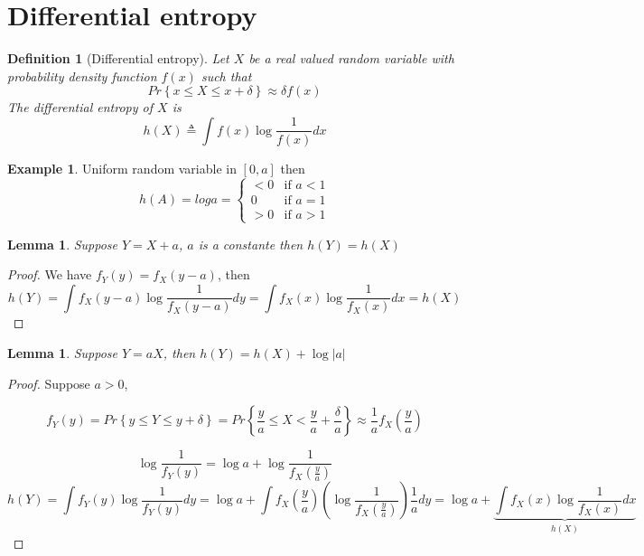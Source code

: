 \documentclass[twoside]{article}
\newtheorem{lemma}[theorem]{Lemma}
\newtheorem{definition}{Definition}[section]
\theoremstyle{definition} %
\newtheorem{example}{Example}
\renewcommand{\Pr}[1]{Pr\left\{#1\right\}}
\newcommand{\pfrac}[2]{\left( \frac{#1}{#2} \right)}
\begin{document}

\cleardoublepage
\section{Differential entropy}

\begin{definition}[Differential entropy]
  Let $X$ be a real valued random variable with probability density function $f(x)$ such that
  \[
    \Pr{x \leq X \leq x + \delta} \approx \delta f(x)
  \]
  The differential entropy of $X$ is
  \[
    h(X) \triangleq \int f(x) \log \frac 1 {f(x)} dx
  \]
\end{definition}

\begin{example}
  Uniform random variable in $[0,a]$ then \[
    h(A) = log a = \begin{cases}
      < 0 & \text{if } a < 1\\
      0 & \text{if } a = 1\\
      > 0 & \text{if } a > 1
    \end{cases}
  \]
\end{example}

\begin{lemma}
  Suppose $Y=X+a$, $a$ is a constante then $h(Y)=h(X)$
\end{lemma}

\begin{proof}
  We have $f_Y(y) = f_X(y-a)$, then
  \[
    h(Y) = \int f_X(y-a) \log \frac 1 {f_X(y-a)}dy = \int f_X(x) \log \frac 1 {f_X(x)}dx = h(X)
  \]
\end{proof}

\begin{lemma}
  Suppose $Y=aX$, then $h(Y) = h(X) + \log |a|$
\end{lemma}

\begin{proof}
  Suppose $a > 0$,

  \[
    f_Y(y) = \Pr{y\leq Y \leq y + \delta} = \Pr{\frac y a \leq X < \frac y a + \frac \delta a} \approx \frac 1 a f_X \pfrac y a
  \]

  \[
    \log \frac 1 {f_Y(y)} = \log a + \log \frac 1 {f_X\pfrac y a}
  \]
  \[
    h(Y) = \int f_Y(y) \log \frac 1 {f_Y(y)} dy = \log a + \int f_X \pfrac y a \left(\log \frac 1 {f_X\pfrac y a} \right) \frac 1 a dy = \log a + \underbrace{\int f_X(x) \log \frac 1 {f_X(x)} dx}_{h(X)}
  \]
\end{proof}
\end{document}
